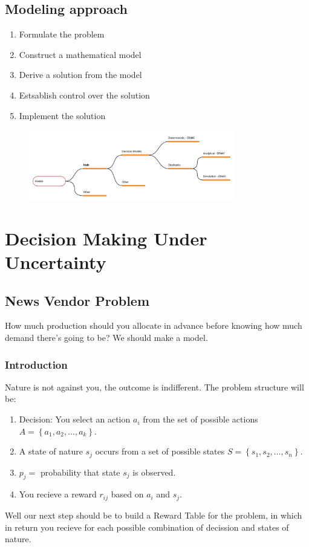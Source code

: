 \documentclass{report}
\begin{document}
  \section{Modeling approach}
    \begin{enumerate}
        \item Formulate the problem
        \item Construct a mathematical model
        \item Derive a solution from the model
        \item Estsablish control over the solution
        \item Implement the solution
    \end{enumerate}
    \vspace{-1cm}
    \begin{figure}[h]
        \centering
        \includegraphics[width=0.8\textwidth]{fotos/models.png}
    \end{figure}

\chapter{Decision Making Under Uncertainty}
    \section{News Vendor Problem}
        How much production should you allocate in advance before knowing how much demand there's going to be? We should make a model.
        \subsection{Introduction}
            Nature is not against you, the outcome is indifferent. The problem structure will be:
            \begin{enumerate}
                \item Decision: You select an action $a_i$ from the set of possible actions $A=\left\{a_1,a_2,\dots,a_k\right\}$.
                \item A state of nature $s_j$ occurs from a set of possible states $S=\left\{s_1,s_2,\dots,s_n\right\}$.
                \item $p_j=$ probability that state $s_j$ is observed.
                \item You recieve a reward $r_{ij}$ based on $a_i$ and $s_j$.
            \end{enumerate}
            Well our next step should  be to build a Reward Table for the problem, in which in return you recieve for each possible combination of decission and states of nature.
            
\end{document}
